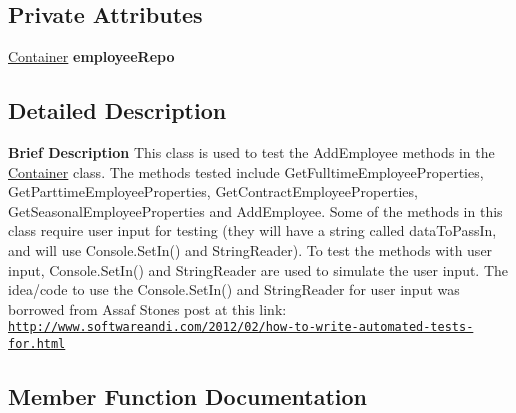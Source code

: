 \subsection*{Private Attributes}
\begin{DoxyCompactItemize}
\item 
\hypertarget{class_the_company_1_1_tests_1_1_add_employee_tests_af3ae11de7dbfe8a320fa9820ef398847}{}\hyperlink{class_the_company_1_1_container}{Container} {\bfseries employee\+Repo}\label{class_the_company_1_1_tests_1_1_add_employee_tests_af3ae11de7dbfe8a320fa9820ef398847}

\end{DoxyCompactItemize}


\subsection{Detailed Description}
{\bfseries  Brief Description} This class is used to test the Add\+Employee methods in the \hyperlink{class_the_company_1_1_container}{Container} class. The methods tested include Get\+Fulltime\+Employee\+Properties, Get\+Parttime\+Employee\+Properties, Get\+Contract\+Employee\+Properties, Get\+Seasonal\+Employee\+Properties and Add\+Employee. Some of the methods in this class require user input for testing (they will have a string called data\+To\+Pass\+In, and will use Console.\+Set\+In() and String\+Reader). To test the methods with user input, Console.\+Set\+In() and String\+Reader are used to simulate the user input. The idea/code to use the Console.\+Set\+In() and String\+Reader for user input was borrowed from Assaf Stone\textquotesingle{}s post at this link\+: \href{http://www.softwareandi.com/2012/02/how-to-write-automated-tests-for.html}{\tt http\+://www.\+softwareandi.\+com/2012/02/how-\/to-\/write-\/automated-\/tests-\/for.\+html} 

\subsection{Member Function Documentation}
\hypertarget{class_the_company_1_1_tests_1_1_add_employee_tests_a5df4ad5271ea9e8b1d34111800128944}{}
